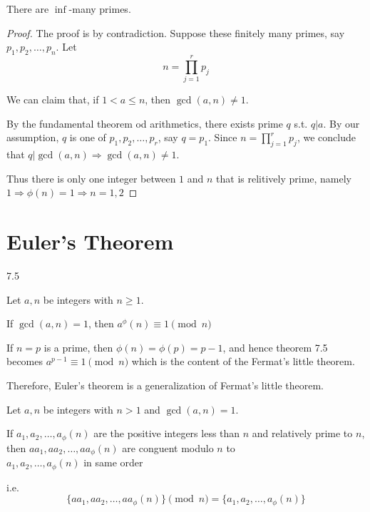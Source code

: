 \begin{corollary}
    There are $\inf$-many primes.
\end{corollary}
\begin{proof}
    The proof is by contradiction. Suppose these finitely many primes, say $p_1, p_2, \ldots, p_n$.
    Let
    \[
        n = \prod_{j=1}^{r}p_j
    \]

    We can claim that, if $1 < a \leq n$, then $\gcd(a, n) \neq 1$.

    By the fundamental theorem od arithmetics, there exists prime $q$ s.t. $q | a$.
    By our assumption, $q$ is one of $p_1, p_2, \dots, p_r$, say $q = p_1$.
    Since $n = \prod_{j=1}^{r}p_j$, we conclude that $q | \gcd(a, n) \Rightarrow \gcd(a, n) \neq 1$.

    Thus there is only one integer between $1$ and $n$ that is relitively prime, namely $1 \Rightarrow \phi(n) = 1 \Rightarrow n = 1, 2$
\end{proof}

\setcounter{section}{2}
\section{Euler's Theorem}

\begin{theorem}
    7.5

    Let $a, n$ be integers with $n \geq 1$.

    If $\gcd(a, n) = 1$, then $a^\phi(n) \equiv 1 \pmod n$

\end{theorem}
\begin{remark}
    If $n = p$ is a prime, then $\phi(n) = \phi(p) = p - 1$, and hence theorem 7.5 becomes $a^{p-1} \equiv 1 \pmod n$
    which is the content of the Fermat's little theorem.

    Therefore, Euler's theorem is a generalization of Fermat's little theorem.
\end{remark}

\begin{lemma}
    Let $a, n$ be integers with $n > 1$ and $\gcd(a, n) = 1$.

    If $a_1, a_2, \dots, a_\phi(n)$ are the positive integers less than $n$ and relatively prime to $n$, then
    $aa_1, aa_2, \dots, aa_\phi(n)$ are conguent modulo $n$ to \\ $a_1, a_2, \dots, a_\phi(n)$ in same order

    i.e.
    \[
        \{aa_1, aa_2, \dots, aa_\phi(n)\} \pmod n = \{a_1, a_2, \dots, a_\phi(n)\}
    \]
\end{lemma}
